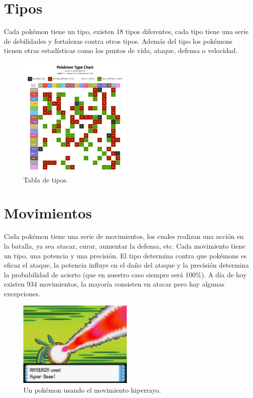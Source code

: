 \section{Tipos}
Cada pokémon tiene un tipo, existen 18 tipos diferentes, cada tipo tiene una serie de debilidades y fortalezas contra otros tipos. Además del tipo los pokémons tienen otras estadísticas como los puntos de vida, ataque, defensa o velocidad. 

\begin{figure}[H]
	\centering
	\includegraphics[width=0.5\textwidth]{figures/chart.png}
	\caption{Tabla de tipos.}
	\label{fig:types}
\end{figure}

\section{Movimientos}
Cada pokémon tiene una serie de movimientos, los cuales realizan una acción en la batalla, ya sea atacar, curar, aumentar la defensa, etc. Cada movimiento tiene un tipo, una potencia y una precisión. El tipo determina contra que pokémons es eficaz el ataque, la potencia influye en el daño del ataque y la precisión determina la probabilidad de acierto (que en nuestro caso siempre será 100\%). A día de hoy existen 934 movimientos, la mayoría consisten en atacar pero hay algunas excepciones.

\begin{figure}[H]
	\centering
	\includegraphics[width=0.5\textwidth]{figures/hiperrayo.jpg}
	\caption{Un pokémon usando el movimiento hiperrayo.}
	\label{fig:hiperrayo}
\end{figure}
